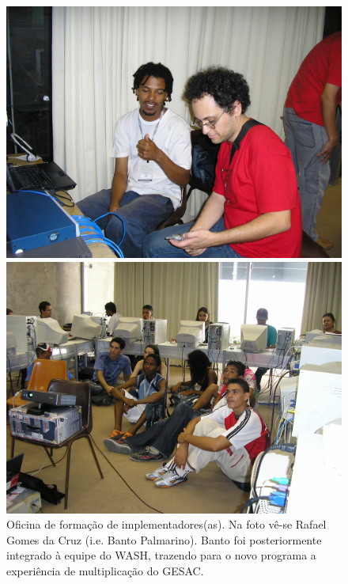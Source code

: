\captionsetup{format=plain}
\begin{figure}[p]

\centering


\begin{minipage}[b]{0.4\linewidth}
        \centering
                \includegraphics[width=1.0\linewidth]{../../../imagens/bantorafa.JPG}
                \caption{Oficina de formação de implementadores(as). Na foto vê-se Rafael Gomes da Cruz (i.e. Banto Palmarino). Banto foi posteriormente integrado à equipe do WASH, trazendo para o novo programa a experiência de multiplicação do GESAC.}
                \label{d2d74ac61c1b95a746858e8420d24348e1b48f51}
\end{minipage}%
\hspace{0.5cm}
\begin{minipage}[b]{0.4\linewidth}
        \centering
                \includegraphics[width=1.0\linewidth]{../../../imagens/oficinalac.JPG}

\end{minipage}
\end{figure}
